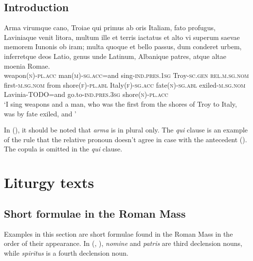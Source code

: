 \documentclass[a4paper, oneside, 12pt]{report}
\newcommand{\form}[1]{\emph{#1}}
\newcommand*{\category}[1]{\textsc{#1}}
\newcommand{\translate}[1]{`#1'}
\begin{document}
\subsection{Introduction}



\begin{exe}
    \ex\label{ex:text.aeneid.1.1} \gll Arma virumque cano, Troiae qui primus ab oris
    Italiam, fato profugus, Laviniaque venit litora, 
    multum ille et terris iactatus et alto
    vi superum saevae memorem Iunonis ob iram;
    multa quoque et bello passus, dum conderet urbem,  
    inferretque deos Latio, genus unde Latinum,
    Albanique patres, atque altae moenia Romae. \\
    weapon(\category{n})-\category{pl}.\category{acc} 
    man(\category{m})-\category{sg}.\category{acc}=and 
    sing-\category{ind}.\category{pres}.\category{1sg}
    Troy-\category{sc}.\category{gen} 
    \category{rel}.\category{m}.\category{sg}.\category{nom}
    first-\category{m}.\category{sg}.\category{nom} 
    from shore(\category{f})-\category{pl}.\category{abl} 
    Italy(\category{f})-\category{sg}.\category{acc} 
    fate(\category{n})-\category{sg}.\category{abl} 
    exiled-\category{m}.\category{sg}.\category{nom} 
    Lavinia-TODO=and  
    go.to-\category{ind}.\category{pres}.\category{3sg} 
    shore(\category{n})-\category{pl}.\category{acc} \\
    \glt \translate{I sing weapons and a man, 
    who was the first from the shores of Troy to Italy, 
    was by fate exiled, 
    and }
\end{exe}

In (),
it should be noted that \form{arma} is in plural only.
The \form{qui} clause is an example of the rule 
that the relative pronoun doesn't agree in case 
with the antecedent ().
The copula is omitted in the \form{qui} clause.


\section{Liturgy texts}

\subsection{Short formulae in the Roman Mass}

Examples in this section are short formulae found in the Roman Mass
in the order of their appearance.
In (, ),
\form{nomine} and \form{patris} are third declension nouns, 
while \form{spiritus} is a fourth declension noun. 
\end{document}
